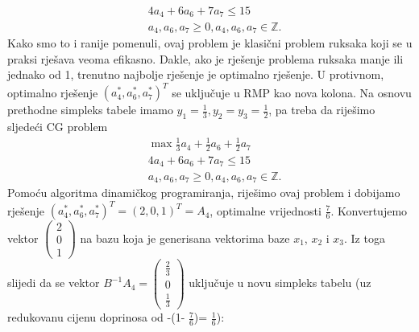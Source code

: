 \documentclass[b5paper, utf8, 11pt, colorlinks]{book}
\theoremstyle{definition}
\begin{document}
\begin{align}
   &	4 a_4 + 6 a_6 + 7 a_7 \leq 15 \\
   &	a_4, a_6, a_7 \geq 0, a_4, a_6, a_7 \in \mathbb{Z}.
\end{align}
Kako smo to i ranije pomenuli, ovaj problem je klasični problem ruksaka koji se u praksi rješava veoma efikasno. Dakle, ako je rješenje problema ruksaka manje ili jednako od 1, trenutno najbolje rješenje je optimalno rješenje. U protivnom, optimalno rješenje $(a_4^*, a_6^*, a_7^*)^T$ se uključuje  u RMP kao nova kolona. Na osnovu prethodne simpleks tabele imamo $y_1 = \frac{1}{3}, y_2 = y_3 = \frac{1}{2}$, pa treba da riješimo sljedeći CG problem
\begin{align*}
      &\max \frac{1}{3} a_4 + \frac{1}{2} a_6 + \frac{1}{2} a_7 \\
      & 4 a_4 + 6 a_6 + 7 a_7 \leq 15 \\
      & 	a_4, a_6, a_7 \geq 0, a_4, a_6, a_7 \in \mathbb{Z}.
\end{align*}
Pomoću algoritma dinamičkog programiranja, riješimo ovaj problem i dobijamo rješenje 
$(a_4^*, a_6^*, a_7^*)^T =  (2, 0, 1)^T=A_4$, optimalne vrijednosti $\frac{7}{6}$. Konvertujemo vektor $\begin{pmatrix}
	2\\
    0 \\
    1
\end{pmatrix}$
na bazu koja je generisana vektorima baze $x_1$, $x_2$ i $x_3$.  Iz toga slijedi da se vektor 
$ B^{-1}A_4 = \begin{pmatrix}
	  \frac{2}{3} \\
	  0           \\
	  \frac{1}{3}
\end{pmatrix}$ uključuje u novu simpleks tabelu (uz redukovanu cijenu doprinosa od -(1- $\frac{7}{6}$)= $\frac{1}{6}$):
\end{document}
